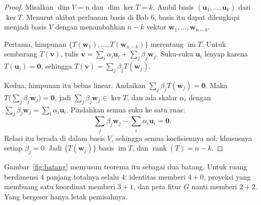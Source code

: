 \begin{proof}
Misalkan $\dim V=n$ dan $\dim\ker T=k$. Ambil basis
$(\mathbf{u}_{1},\dots,\mathbf{u}_{k})$ dari $\ker T$. Menurut akibat perluasan basis di Bab 6,
basis itu dapat dilengkapi menjadi basis $V$ dengan menambahkan $n-k$ vektor
$\mathbf{w}_{1},\dots,\mathbf{w}_{n-k}$.

Pertama, himpunan $\{T(\mathbf{w}_{1}),\dots,T(\mathbf{w}_{n-k})\}$ merentang
$\operatorname{im}T$. Untuk sembarang $T(\mathbf{v})$, tulis
$\mathbf{v}=\sum_{i}\alpha_{i}\mathbf{u}_{i}+\sum_{j}\beta_{j}\mathbf{w}_{j}$. Suku-suku
$\mathbf{u}_{i}$ lenyap karena $T(\mathbf{u}_{i})=\mathbf{0}$, sehingga
$T(\mathbf{v})=\sum_{j}\beta_{j}T(\mathbf{w}_{j})$.

Kedua, himpunan itu bebas linear. Andaikan $\sum_{j}\beta_{j}T(\mathbf{w}_{j})=\mathbf{0}$.
Maka $T\bigl(\sum_{j}\beta_{j}\mathbf{w}_{j}\bigr)=\mathbf{0}$, jadi
$\sum_{j}\beta_{j}\mathbf{w}_{j}\in\ker T$, dan ada skalar $\alpha_{i}$ dengan
$\sum_{j}\beta_{j}\mathbf{w}_{j}=\sum_{i}\alpha_{i}\mathbf{u}_{i}$. Pindahkan semua suku ke
satu ruas:
\[
  \sum_{j}\beta_{j}\mathbf{w}_{j}-\sum_{i}\alpha_{i}\mathbf{u}_{i}=\mathbf{0}.
\]
Relasi itu berada di dalam basis $V$, sehingga semua koefisiennya nol; khususnya setiap
$\beta_{j}=0$. Jadi $\{T(\mathbf{w}_{j})\}$ basis $\operatorname{im}T$, dan
$\operatorname{rank}(T)=n-k$.
\end{proof}

Gambar~\ref{fig:batang} menyusun teorema itu sebagai dua batang. Untuk ruang berdimensi
$4$ panjang totalnya selalu $4$: identitas memberi $4+0$, proyeksi yang membuang satu
koordinat
memberi $3+1$, dan peta fitur $G$ nanti memberi $2+2$. Yang bergeser hanya letak pemisahnya.

